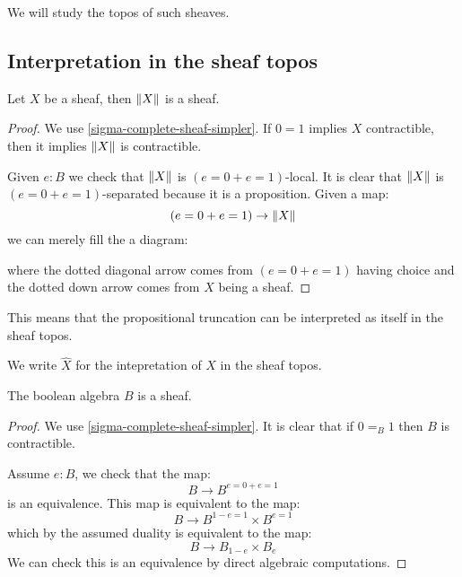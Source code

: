 We will study the topos of such sheaves.


\subsection{Interpretation in the sheaf topos}

\begin{lemma}\label{prop-trunc-sheaf-sigma-complete}
Let $X$ be a sheaf, then $\lVert X \rVert$ is a sheaf. 
\end{lemma}

\begin{proof}
We use \cref{sigma-complete-sheaf-simpler}. If $0=1$ implies $X$ contractible, then it implies $\lVert X \rVert$ is contractible.

Given $e:B$ we check that $\lVert X \rVert$ is $(e=0 + e=1)$-local. It is clear that $\lVert X \rVert$ is $(e=0+e=1)$-separated because it is a proposition. Given a map:
\[(e=0+e=1) \to \lVert X \rVert\]
we can merely fill the a diagram:
\begin{center}
\end{center}
where the dotted diagonal arrow comes from $(e=0+e=1)$ having choice and the dotted down arrow comes from $X$ being a sheaf.
\end{proof}

This means that the propositional truncation can be interpreted as itself in the sheaf topos.

We write $\hat{X}$ for the intepretation of $X$ in the sheaf topos. 

\begin{lemma}
The boolean algebra $B$ is a sheaf.
\end{lemma}

\begin{proof}
We use \cref{sigma-complete-sheaf-simpler}. It is clear that if $0=_B1$ then $B$ is contractible.

Assume $e:B$, we check that the map:
\[B\to B^{e=0+e=1}\]
is an equivalence. This map is equivalent to the map:
\[B\to B^{1-e=1}\times B^{e=1}\]
which by the assumed duality is equivalent to the map:
\[B\to B_{1-e}\times B_e\]
We can check this is an equivalence by direct algebraic computations.
\end{proof}

